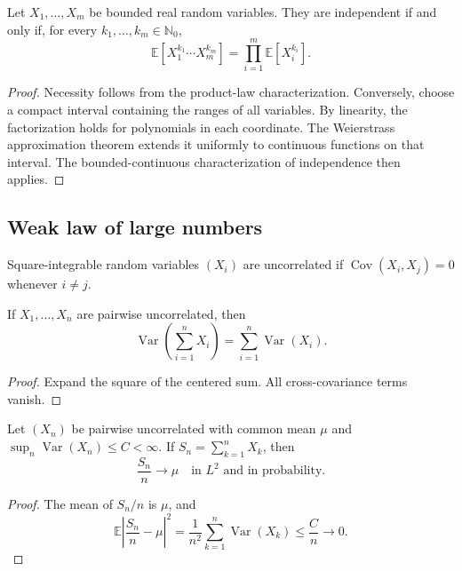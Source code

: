 \begin{thm}
Let $X_1,\ldots,X_m$ be bounded real random variables. They are independent
if and only if, for every $k_1,\ldots,k_m\in\mathbb N_0$,
\[
\mathbb E[X_1^{k_1}\cdots X_m^{k_m}]
 =\prod_{i=1}^{m}\mathbb E[X_i^{k_i}].
\]
\end{thm}

\begin{proof}
Necessity follows from the product-law characterization. Conversely, choose
a compact interval containing the ranges of all variables. By linearity, the
factorization holds for polynomials in each coordinate. The Weierstrass
approximation theorem extends it uniformly to continuous functions on that
interval. The bounded-continuous characterization of independence then
applies.
\end{proof}

\subsection{Weak law of large numbers}

\begin{de}
Square-integrable random variables $(X_i)$ are uncorrelated if
$\operatorname{Cov}(X_i,X_j)=0$ whenever $i\neq j$.
\end{de}

\begin{prop}
If $X_1,\ldots,X_n$ are pairwise uncorrelated, then
\[
\operatorname{Var}\!\left(\sum_{i=1}^{n}X_i\right)
 =\sum_{i=1}^{n}\operatorname{Var}(X_i).
\]
\end{prop}

\begin{proof}
Expand the square of the centered sum. All cross-covariance terms vanish.
\end{proof}

\begin{thm}
Let $(X_n)$ be pairwise uncorrelated with common mean $\mu$ and
$\sup_n\operatorname{Var}(X_n)\leq C<\infty$. If
$S_n=\sum_{k=1}^{n}X_k$, then
\[
\frac{S_n}{n}\longrightarrow\mu
\quad\text{in }L^2\text{ and in probability}.
\]
\end{thm}

\begin{proof}
The mean of $S_n/n$ is $\mu$, and
\[
\mathbb E\left|\frac{S_n}{n}-\mu\right|^2
 =\frac1{n^2}\sum_{k=1}^{n}\operatorname{Var}(X_k)
 \leq\frac Cn\to0.
\]
\end{proof}

